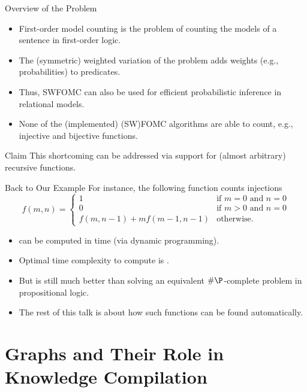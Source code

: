 \documentclass{beamer}
\begin{document}
\begin{frame}{Overview of the Problem}
  \begin{itemize}
  \item \alert{First-order model counting} is the problem of counting the models of a sentence in first-order logic.
  \item The \alert{(symmetric) weighted} variation of the problem adds weights (e.g., probabilities) to predicates.
  \item Thus, SWFOMC can also be used for efficient \alert{probabilistic inference} in relational models.
  \item None of the (implemented) (SW)FOMC algorithms are able to count, e.g., \alert{injective} and \alert{bijective} functions.
  \end{itemize}
  \begin{block}{Claim}
    This shortcoming can be addressed via support for (almost arbitrary) \alert{recursive functions}.
  \end{block}
\end{frame}

\begin{frame}{Back to Our Example}
  For instance, the following function counts injections
  \[
  f(m, n) =
  \begin{cases}
    1 & \text{if } m = 0 \text{ and } n = 0 \\
    0 & \text{if } m > 0 \text{ and } n = 0 \\
    f(m, n-1) + mf(m-1, n-1) & \text{otherwise.}
  \end{cases}
  \]
  \pause
  \begin{itemize}
  \item {} can be computed in  time (via dynamic programming).
  \item Optimal time complexity to compute  is .
  \item But  is still much better than solving an equivalent \alert{$\#\P$-complete} problem in propositional logic.
  \item The rest of this talk is about how such functions can be found automatically.
  \end{itemize}
\end{frame}

\section{Graphs and Their Role in Knowledge Compilation}
\end{document}
